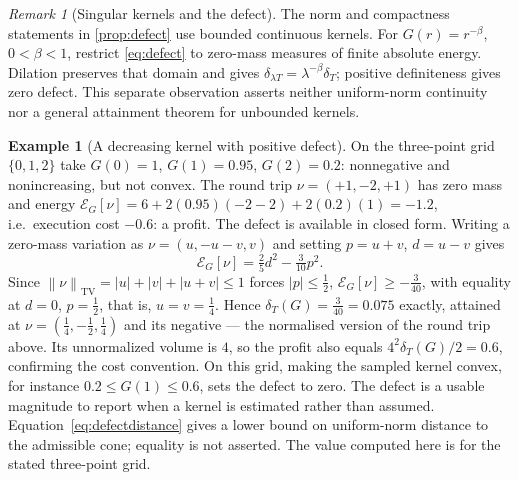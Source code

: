 \documentclass[11pt]{article}
\newcommand{\norm}[1]{\left\lVert #1\right\rVert}
\numberwithin{equation}{section}
\theoremstyle{definition}
\theoremstyle{remark}
\newtheorem{remark}[theorem]{Remark}
\theoremstyle{definition}
\newtheorem{example}[theorem]{Example}
\newcommand{\TV}{\operatorname{TV}}
\begin{document}
\begin{remark}[Singular kernels and the defect]\label{rem:rieszdefect}
The norm and compactness statements in \cref{prop:defect} use bounded
continuous kernels. For $G(r)=r^{-\beta}$, $0<\beta<1$, restrict
\eqref{eq:defect} to zero-mass measures of finite absolute energy.
Dilation preserves that domain and gives
$\delta_{\lambda T}=\lambda^{-\beta}\delta_T$; positive definiteness gives
zero defect. This separate observation asserts neither uniform-norm
continuity nor a general attainment theorem for unbounded kernels.
\end{remark}

\begin{example}[A decreasing kernel with positive defect]\label{ex:defect}
On the three-point grid $\{0,1,2\}$ take $G(0)=1$, $G(1)=0.95$, $G(2)=0.2$:
nonnegative and nonincreasing, but not convex. The round trip
$\nu=(+1,-2,+1)$ has zero mass and energy
$\mathcal E_G[\nu]=6+2(0.95)(-2-2)+2(0.2)(1)=-1.2$, i.e.\ execution cost
$-0.6$: a profit. The defect is available in closed form. Writing a zero-mass
variation as $\nu=(u,-u-v,v)$ and setting $p=u+v$, $d=u-v$ gives
\begin{equation}\label{eq:defect-3pt-form}
 \mathcal E_G[\nu]=\tfrac{2}{5}d^2-\tfrac{3}{10}p^2.
\end{equation}
Since $\norm\nu_{\TV}=|u|+|v|+|u+v|\le1$ forces $|p|\le\tfrac12$,
$\mathcal E_G[\nu]\ge-\tfrac{3}{40}$, with equality at $d=0$, $p=\tfrac12$,
that is, $u=v=\tfrac14$. Hence
$\delta_T(G)=\tfrac3{40}=0.075$ exactly, attained at
$\nu=(\tfrac14,-\tfrac12,\tfrac14)$ and its negative --- the normalised version
of the round trip above.
Its unnormalized volume is $4$, so the profit also equals
$4^2\delta_T(G)/2=0.6$, confirming the cost convention.
On this grid, making the sampled kernel convex, for instance
$0.2\leq G(1)\leq0.6$, sets the defect to zero. The defect is a usable magnitude to
report when a kernel is estimated rather than assumed. Equation~\eqref{eq:defectdistance}
gives a lower bound on uniform-norm distance to the admissible cone; equality
is not asserted. The value computed here is for the stated three-point grid.
\end{example}
\end{document}
